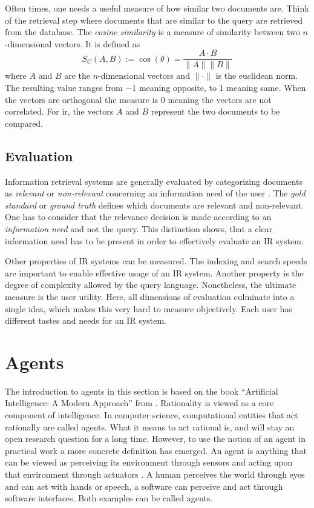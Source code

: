 \documentclass[../main.tex]{subfiles}
\begin{document}
Often times, one needs a useful measure of how similar two documents are.
Think of the retrieval step where documents that are similar to the query
are retrieved from the database.
The \emph{cosine similarity} is a measure of similarity
between two $n$-dimensional vectors.
It is defined as
\begin{equation}
    S_C(A,B) := \cos(\theta) = \frac{A \cdot B}{\lVert A \rVert \lVert B \rVert}
\end{equation}
where $A$ and $B$ are the $n$-dimensional vectors and $\lVert \cdot \rVert$ is the
euclidean norm. The resulting value ranges from $-1$ meaning opposite, to $1$ meaning
same. When the vectors are orthogonal the measure is $0$ meaning the vectors are not
correlated. For \gls{ir}, the vectors $A$ and $B$ represent the two documents to be compared.


\subsection{Evaluation}

Information retrieval systems are generally evaluated by categorizing documents
as \emph{relevant} or \emph{non-relevant} concerning an information need of the user \cite{Manning2009}.
The \emph{gold standard} or \emph{ground truth} defines which documents are relevant and non-relevant.
One has to consider that the relevance
decision is made according to an \emph{information need} and not the query.
This distinction shows,
that a clear information need has to be present in order to effectively evaluate an IR system.

Other properties of IR systems can be measured.
The indexing and search speeds are important to enable effective usage of an IR system.
Another property is the degree of complexity allowed by the query language.
Nonetheless, the ultimate measure is the user utility.
Here, all dimensions of evaluation culminate into a single idea,
which makes this very hard to measure objectively.
Each user has different tastes and needs for an IR system.

\section{Agents}
\label{sec:agents}

The introduction to agents in this section is based on the book
``Artificial Intelligence: A Modern Approach'' from \citeauthor{Russel2022} \cite{Russel2022}.
Rationality is viewed as a core component of intelligence.
In computer science, computational entities that act rationally are called agents.
What it means to act rational is, and will stay an open research question for a long time.
However, to use the notion of an agent in practical work a more concrete definition has emerged.
An agent is anything that can be viewed as perceiving its environment through sensors
and acting upon that environment through actuators \cite{Russel2022}.
A human perceives the world through eyes and can act with hands or speech,
a software can perceive and act through software interfaces.
Both examples can be called agents.
\end{document}
